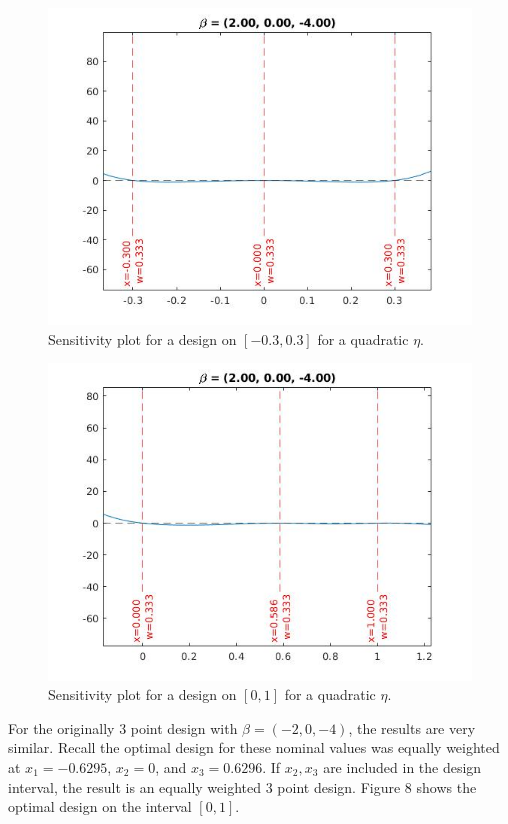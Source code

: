 \documentclass[11pt,a4paper]{article}
\begin{document}
\begin{figure}
\centering
\includegraphics[scale=0.5]{figures/4pt_nonemid.jpg}
\caption{Sensitivity plot for a design on $[-0.3, 0.3]$ for a quadratic $\eta$.}
\end{figure}


\begin{figure}
\centering
\includegraphics[scale=0.5]{figures/4pt_includeend2.jpg}
\caption{Sensitivity plot for a design on $[0,1]$ for a quadratic $\eta$.}
\end{figure}

For the originally 3 point design with $\beta = (-2, 0, -4)$, the results are very similar. Recall the optimal design for these nominal values was equally weighted at $x_1=-0.6295$, $x_2 = 0$,  and $x_3 = 0.6296$. If $x_2, x_3$ are included in the design interval, the result is an equally weighted 3 point design. Figure 8 shows the optimal design on the interval $[0, 1]$.
\end{document}
